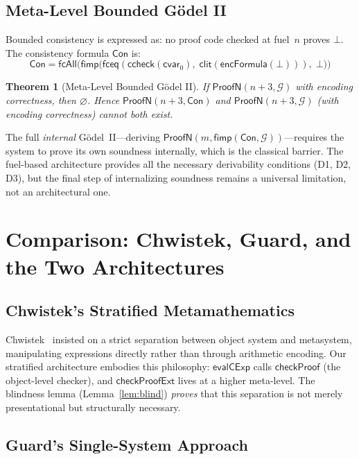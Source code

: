\documentclass[11pt]{article}
\newtheorem{theorem}{Theorem}[section]
\newcommand{\ProofN}{\mathsf{ProofN}}
\newcommand{\evalCExp}{\mathsf{evalCExp}}
\newcommand{\checkProof}{\mathsf{checkProof}}
\newcommand{\encFormula}{\mathsf{encFormula}}
\newcommand{\clit}{\mathsf{clit}}
\newcommand{\ccheck}{\mathsf{ccheck}}
\newcommand{\cvar}{\mathsf{cvar}}
\newcommand{\fbot}{\bot}
\newcommand{\fimp}{\mathsf{fimp}}
\newcommand{\fceq}{\mathsf{fceq}}
\newcommand{\fcAll}{\mathsf{fcAll}}
\newcommand{\GS}{\mathcal{G}}
\begin{document}
\subsection{Meta-Level Bounded G\"odel II}

Bounded consistency is expressed as: no proof code checked at fuel~$n$
proves $\fbot$. The consistency formula $\mathsf{Con}$ is:
\[
  \mathsf{Con} = \fcAll\bigl(\fimp\bigl(
    \fceq(\ccheck(\cvar_0),\; \clit(\encFormula(\fbot))),\;
    \fbot\bigr)\bigr)
\]

\begin{theorem}[Meta-Level Bounded G\"odel II]
  \label{thm:goedel2}
  If\/ $\ProofN(n{+}3, \GS)$ with encoding correctness, then
  $\varnothing$.
  Hence $\ProofN(n{+}3, \mathsf{Con})$ and
  $\ProofN(n{+}3, \GS)$ (with encoding correctness) cannot
  both exist.
\end{theorem}

The full \emph{internal} G\"odel~II---deriving
$\ProofN(m, \fimp(\mathsf{Con}, \GS))$---requires the system to prove
its own soundness internally, which is the classical barrier. The
fuel-based architecture provides all the necessary derivability
conditions (D1, D2, D3), but the final step of internalizing soundness
remains a universal limitation, not an architectural one.

\section{Comparison: Chwistek, Guard, and the Two Architectures}
\label{sec:comparison}

\subsection{Chwistek's Stratified Metamathematics}

Chwistek~\cite{Chwistek1939} insisted on a strict separation between
object system and metasystem, manipulating expressions directly rather
than through arithmetic encoding. Our stratified architecture embodies
this philosophy: $\evalCExp$ calls $\checkProof$ (the object-level
checker), and $\mathsf{checkProofExt}$ lives at a higher meta-level.
The blindness lemma (Lemma~\ref{lem:blind}) \emph{proves} that this
separation is not merely presentational but structurally necessary.

\subsection{Guard's Single-System Approach}
\end{document}
